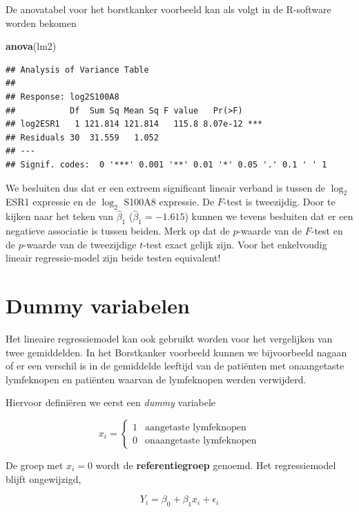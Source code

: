 \documentclass[
  12pt,dutch]{book}
\newenvironment{Shaded}{\begin{snugshade}}{\end{snugshade}}
\newcommand{\FunctionTok}[1]{\textcolor[rgb]{0.13,0.29,0.53}{\textbf{#1}}}
\newcommand{\NormalTok}[1]{#1}
\theoremstyle{definition}
\theoremstyle{definition}
\theoremstyle{definition}
\theoremstyle{definition}
\theoremstyle{remark}
\begin{document}
De anovatabel voor het borstkanker voorbeeld kan als volgt in de R-software worden bekomen

\begin{Shaded}
\begin{Highlighting}[]
\FunctionTok{anova}\NormalTok{(lm2)}
\end{Highlighting}
\end{Shaded}

\begin{verbatim}
## Analysis of Variance Table
## 
## Response: log2S100A8
##           Df  Sum Sq Mean Sq F value   Pr(>F)    
## log2ESR1   1 121.814 121.814   115.8 8.07e-12 ***
## Residuals 30  31.559   1.052                     
## ---
## Signif. codes:  0 '***' 0.001 '**' 0.01 '*' 0.05 '.' 0.1 ' ' 1
\end{verbatim}

We besluiten dus dat er een extreem significant lineair verband is tussen de \(\log_2\) ESR1 expressie en de \(\log_2\) S100A8 expressie. De \(F\)-test is tweezijdig. Door te kijken naar het teken van \(\hat\beta_1\) (\(\hat\beta_1=-1.615\)) kunnen we tevens besluiten dat er een negatieve associatie is tussen beiden.
Merk op dat de \(p\)-waarde van de \(F\)-test en de \(p\)-waarde van de tweezijdige \(t\)-test exact gelijk zijn. Voor het enkelvoudig lineair regressie-model zijn beide testen equivalent!

\section{Dummy variabelen}\label{sec:linDummy}

Het lineaire regressiemodel kan ook gebruikt worden voor het vergelijken van twee gemiddelden.
In het Borstkanker voorbeeld kunnen we bijvoorbeeld nagaan of er een verschil is in de gemiddelde leeftijd van de patiënten met onaangetaste lymfeknopen en patiënten waarvan de lymfeknopen werden verwijderd.

Hiervoor definiëren we eerst een \emph{dummy} variabele

\[x_i = \left\{ \begin{array}{ll}
1 & \text{aangetaste lymfeknopen} \\
0 & \text{onaangetaste lymfeknopen} \end{array}\right.\]

De groep met \(x_i=0\) wordt de \textbf{referentiegroep} genoemd.
Het regressiemodel blijft ongewijzigd,

\[Y_i = \beta_0 + \beta_1 x_i +\epsilon_i\]
\end{document}
